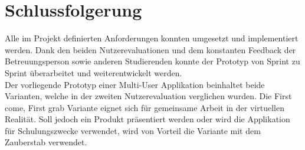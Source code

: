 \chapter{Schlussfolgerung}
\label{ch:Schlussfolgerung}

Alle im Projekt definierten Anforderungen konnten umgesetzt und implementiert werden. Dank den beiden Nutzerevaluationen und dem konstanten Feedback der Betreuungsperson sowie anderen Studierenden konnte der Prototyp von Sprint zu Sprint überarbeitet und weiterentwickelt werden. \\

\noindent Der vorliegende Prototyp einer Multi-User Applikation beinhaltet beide Varianten, welche in der zweiten Nutzerevaluation verglichen wurden. Die \grqq First come, First grab\grqq{} Variante eignet sich für gemeinsame Arbeit in der virtuellen Realität. Soll jedoch ein Produkt präsentiert werden oder wird die Applikation für Schulungszwecke verwendet, wird von Vorteil die Variante mit dem Zauberstab verwendet.